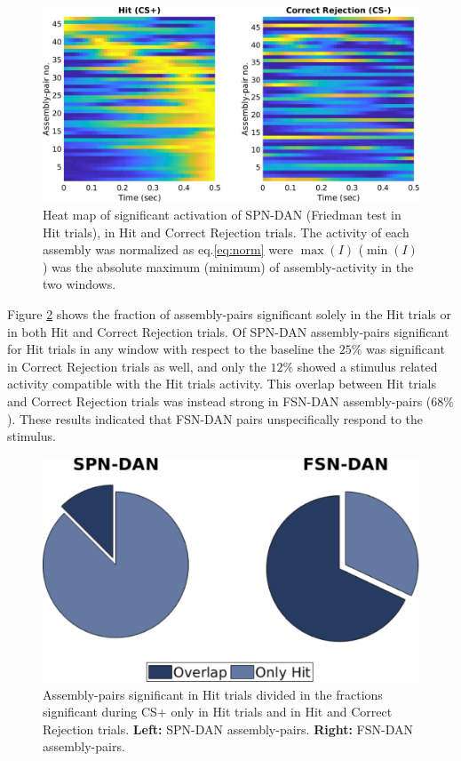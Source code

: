 \begin{figure}[H]
    \centering
    \includegraphics[scale=0.41]{figures/SD_HitCorrRejComp.pdf}
    \caption{Heat map of significant activation of SPN-DAN (Friedman test in Hit trials), in Hit and Correct Rejection trials. The activity of each assembly was normalized as eq.\ref{eq:norm} were $\max(I)$ ($\min(I)$) was the absolute maximum (minimum) of assembly-activity in the two windows.}
    \label{fig:SD_HitCorrComp}
\end{figure}
Figure \ref{fig:Overlap} shows the fraction of assembly-pairs significant solely in the Hit trials or in both Hit and Correct Rejection trials. Of SPN-DAN assembly-pairs significant for Hit trials in any window  with respect to the baseline the $25\%$ was significant in Correct Rejection trials as well, and only the $12\%$ showed a stimulus related activity compatible with the Hit trials activity. This overlap between Hit trials and Correct Rejection trials was instead strong in FSN-DAN assembly-pairs ($68\%$). These results indicated that FSN-DAN pairs unspecifically respond to the stimulus. 
\begin{figure}
    \centering
    \includegraphics[scale=0.5]{figures/HItCorrRejPieOverlapSD_FD.pdf}
    \caption{Assembly-pairs significant in Hit trials divided in the fractions significant during CS+ only in Hit trials and in Hit and Correct Rejection trials. \textbf{Left:} SPN-DAN assembly-pairs. \textbf{Right:} FSN-DAN assembly-pairs.}
    \label{fig:Overlap}
\end{figure}
